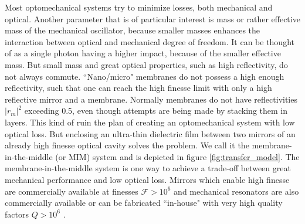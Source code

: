 Most optomechanical systems try to minimize losses, both mechanical and optical. Another parameter that is of particular interest is mass or rather effective mass of the mechanical oscillator, because smaller masses enhances the interaction between optical and mechanical degree of freedom. It can be thought of as a single photon having a higher impact, because of the smaller effective mass. But small mass and great optical properties, such as high reflectivity, do not always commute. ``Nano/micro" membranes do not possess a high enough reflectivity, such that one can reach the high finesse limit with only a high reflective mirror and a membrane. Normally membranes do not have reflectivities $\left| r_m \right|^2$ exceeding 0.5, even though attempts are being made by stacking them in layers. This kind of ruin the plan of creating an optomechanical system with low optical loss. But enclosing an ultra-thin dielectric film between two mirrors of an already high finesse optical cavity solves the problem. We call it the membrane-in-the-middle (or MIM) system \cite{thompson2008,jayich2008} and is depicted in figure \ref{fig:transfer_model}.
The membrane-in-the-middle system is one way to achieve a trade-off between great mechanical performance and low optical loss. Mirrors which enable high finesse are commercially available at finesses $\mathcal{F} > 10^6$ and mechanical resonators are also commercially available \cite{jayich2008} or can be fabricated ``in-house" with very high quality factors $Q > 10^6$ \cite{tsaturyan2014}.